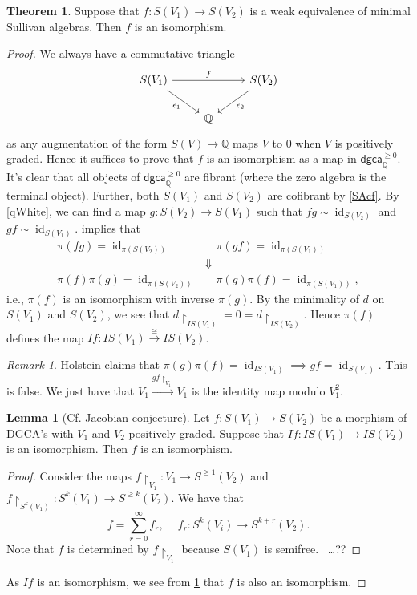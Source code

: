 \documentclass[10pt,letterpaper,cm]{nupset}
\theoremstyle{definition}
\theoremstyle{theorem}
\newtheorem{theorem}[defn]{Theorem}
\newtheorem{lemma}[defn]{Lemma}
\theoremstyle{remark}
\newtheorem{remark}[defn]{Remark}
\newcommand{\Q}{\mathbb Q}
\newcommand{\1}{\mathbb{1}}
\newcommand{\dgca}{\mathsf{dgca}}
\newcommand{\0}{\vec 0}
\DeclareMathOperator{\id}{id}
\begin{document}
\begin{theorem}\label{weiso}
Suppose that $f: S(V_1) \to S(V_2)$ is a weak equivalence of minimal Sullivan algebras. Then $f$ is an isomorphism.
\end{theorem}
\begin{proof}
We always have a commutative triangle
\[
\begin{tikzcd}
	{S(V_1)} & {} & {S(V_2)} \\
	& \Q
	\arrow["f", from=1-1, to=1-3]
	\arrow["{\epsilon_1}"', from=1-1, to=2-2]
	\arrow["{\epsilon_2}", from=1-3, to=2-2]
\end{tikzcd}
\] as any augmentation of the form $S(V) \to \Q$ maps $V$ to $0$  when $V$ is positively graded. Hence it suffices to prove that $f$ is an isomorphism as a map in $\dgca_{\Q}^{\geq 0}$. It's clear that all objects of $\dgca_{\Q}^{\geq 0}$ are fibrant (where the zero algebra is the terminal object). Further, both $S(V_1)$ and $S(V_2)$ are cofibrant by \cref{SAcf}. By \cref{qWhite}, we can find a map $g: S(V_2) \to S(V_1)$ such that $fg \sim \id_{S(V_2)}$ and $gf \sim \id_{S(V_1)}$.   implies  that
\begin{align*}
\pi(fg) = \id_{\pi(S(V_2))} & \quad \pi(gf) = \id_{\pi(S(V_1))} 
\\ & \Downarrow
\\ \pi(f)\pi(g) = \id_{\pi(S(V_2))} & \quad \pi(g)\pi(f) = \id_{\pi(S(V_1))},
\end{align*}
i.e., $\pi(f)$ is an isomorphism with inverse $\pi(g)$.
By the minimality of $d$ on $S(V_1)$ and $S(V_2)$, we see that $d\restriction_{I{S(V_1)}} = 0 = d\restriction_{I{S(V_2)}}$. Hence $\pi(f)$ defines the map $I{f} : I{S(V_1)} \xrightarrow{\cong} I{S(V_2)}$.

\begin{remark}
Holstein claims that $\pi(g)\pi(f) = \id_{I{S(V_1)}} \implies gf= \id_{S(V_1)}$. This is false. We just have that $V_1 \xrightarrow{gf\restriction_{V_1}} V_1$ is the identity map modulo $V_1^2$.
\end{remark}

\begin{lemma}[Cf. Jacobian conjecture]\label{ISiso}
Let $f: S(V_1) \to S(V_2)$ be a morphism of DGCA's with $V_1$ and $V_2$ positively graded. Suppose that $I{f} : I{S(V_1)} \to I{S(V_2)}$ is an isomorphism. Then $f$ is an isomorphism.
\end{lemma}
\begin{proof}
Consider the maps $f\restriction_{V_1} : V_1 \to S^{\geq 1}(V_2)$ and $f\restriction_{S^k(V_1)} : S^k(V_1) \to S^{\geq k}(V_2)$. We have that
\[
f = \sum_{r=0}^{\infty} f_r, \ \quad f_r : S^k(V_i) \to S^{k+r}(V_2)
.\] Note that $f$ is determined by $f\restriction_{V_1}$ because $S(V_1)$ is semifree. \ \ldots ??
\end{proof}

As $I{f}$ is an isomorphism, we see from \cref{ISiso}  that $f$ is also an isomorphism.

\end{proof}
\end{document}
